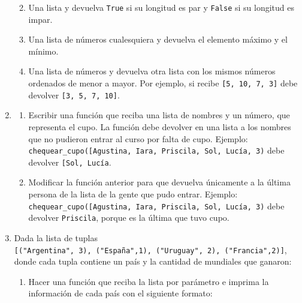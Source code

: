 \documentclass[
  letterpaper,
  DIV=11,
  numbers=noendperiod]{scrreprt}
\providecommand{\tightlist}{%
  \setlength{\itemsep}{0pt}\setlength{\parskip}{0pt}}\usepackage{longtable,booktabs,array}
\begin{document}
\begin{enumerate}
  \begin{enumerate}
  \def\labelenumii{\alph{enumii}.}
  \tightlist
  \item
    Una lista y devuelva \texttt{True} si su longitud es par y
    \texttt{False} si su longitud es impar.\\
  \item
    Una lista de números cualesquiera y devuelva el elemento máximo y el
    mínimo.
  \item
    Una lista de números y devuelva otra lista con los mismos números
    ordenados de menor a mayor. Por ejemplo, si recibe
    \texttt{{[}5,\ 10,\ 7,\ 3{]}} debe devolver
    \texttt{{[}3,\ 5,\ 7,\ 10{]}}.
  \end{enumerate}
\item
  \begin{enumerate}
  \def\labelenumii{\alph{enumii}.}
  \item
    Escribir una función que reciba una lista de nombres y un número,
    que representa el cupo. La función debe devolver en una lista a los
    nombres que no pudieron entrar al curso por falta de cupo. Ejemplo:
    \texttt{chequear\_cupo({[}\textquotesingle{}Agustina\textquotesingle{},\ \textquotesingle{}Iara\textquotesingle{},\ \textquotesingle{}Priscila\textquotesingle{},\ \textquotesingle{}Sol\textquotesingle{},\ \textquotesingle{}Lucía\textquotesingle{}{]},\ 3)}
    debe devolver
    \texttt{{[}\textquotesingle{}Sol\textquotesingle{},\ \textquotesingle{}Lucía\textquotesingle{}{]}}.
  \item
    Modificar la función anterior para que devuelva únicamente a la
    última persona de la lista de la gente que pudo entrar. Ejemplo:
    \texttt{chequear\_cupo({[}\textquotesingle{}Agustina\textquotesingle{},\ \textquotesingle{}Iara\textquotesingle{},\ \textquotesingle{}Priscila\textquotesingle{},\ \textquotesingle{}Sol\textquotesingle{},\ \textquotesingle{}Lucía\textquotesingle{}{]},\ 3)}
    debe devolver \texttt{\textquotesingle{}Priscila\textquotesingle{}},
    porque es la última que tuvo cupo.
  \end{enumerate}
\item
  Dada la lista de tuplas
  \texttt{{[}("Argentina",\ 3),\ ("España",1),\ ("Uruguay",\ 2),\ ("Francia",2){]}},
  donde cada tupla contiene un país y la cantidad de mundiales que
  ganaron:

  \begin{enumerate}
  \def\labelenumii{\alph{enumii}.}
  \tightlist
  \item
    Hacer una función que reciba la lista por parámetro e imprima la
    información de cada país con el siguiente formato:
  \end{enumerate}


\end{enumerate}
\end{document}
